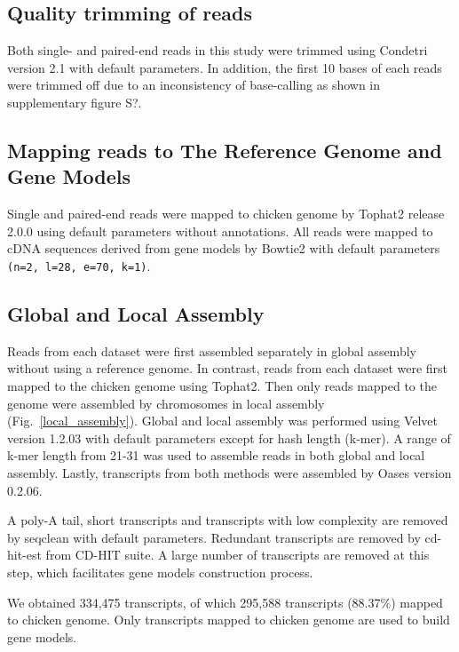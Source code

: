 \documentclass[10pt]{article}
\begin{document}
\subsection*{Quality trimming of reads}
Both single- and paired-end reads in this study were trimmed using Condetri version 2.1 with default parameters.
In addition, the first 10 bases of each reads were trimmed off due to an inconsistency of base-calling as shown in supplementary figure S?.

\subsection*{Mapping reads to The Reference Genome and Gene Models}

Single and paired-end reads were mapped to chicken genome by Tophat2\cite{Trapnell:2009dp} release 2.0.0 using
default parameters without annotations.
All reads were mapped to cDNA sequences derived from gene models by Bowtie2\cite{Langmead:2009fv} with
default parameters \texttt{(n=2, l=28, e=70, k=1)}.

\subsection*{Global and Local Assembly}

Reads from each dataset were first assembled separately in global assembly without using a reference genome.
In contrast, reads from each dataset were first mapped to the chicken genome using Tophat2.
Then only reads mapped to the genome were assembled by chromosomes in local assembly (Fig.~\ref{local_assembly}).
Global and local assembly was performed using Velvet version 1.2.03\cite{Zerbino:2008vu}
with default parameters except for hash length (k-mer).
A range of k-mer length from 21-31 was used to assemble reads in both global and local assembly.
Lastly, transcripts from both methods were assembled by Oases version 0.2.06\cite{Schulz:2012je}.

A poly-A tail, short transcripts and transcripts with low complexity are removed by
seqclean\cite{seqclean} with default parameters.
Redundant transcripts are removed by cd-hit-est from CD-HIT suite\cite{Li:2006hr}.
A large number of transcripts are removed at this step, which facilitates gene models construction process.

We obtained 334,475 transcripts, of which 295,588 transcripts (88.37\%) mapped to chicken genome.
Only transcripts mapped to chicken genome are used to build gene models.
\end{document}
